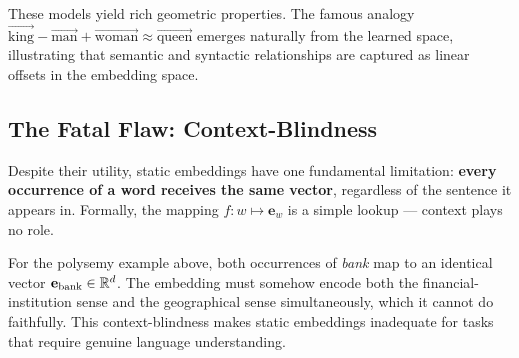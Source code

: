 \noindent
These models yield rich geometric properties. The famous analogy
$\vec{\text{king}} - \vec{\text{man}} + \vec{\text{woman}} \approx
\vec{\text{queen}}$ emerges naturally from the learned space, illustrating that
semantic and syntactic relationships are captured as linear offsets in the
embedding space.

\subsection{The Fatal Flaw: Context-Blindness}

Despite their utility, static embeddings have one fundamental limitation:
\textbf{every occurrence of a word receives the same vector}, regardless of the
sentence it appears in. Formally, the mapping $f\colon w \mapsto \mathbf{e}_w$
is a simple lookup --- context plays no role.

For the polysemy example above, both occurrences of \textit{bank} map to an
identical vector $\mathbf{e}_{\text{bank}} \in \mathbb{R}^d$. The embedding must
somehow encode both the financial-institution sense and the geographical sense
simultaneously, which it cannot do faithfully. This context-blindness makes
static embeddings inadequate for tasks that require genuine language
understanding.
